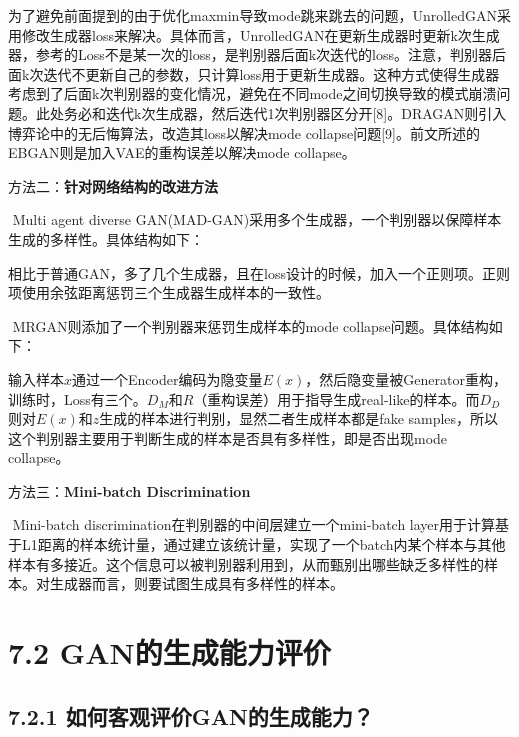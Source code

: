 ​
为了避免前面提到的由于优化maxmin导致mode跳来跳去的问题，UnrolledGAN采用修改生成器loss来解决。具体而言，UnrolledGAN在更新生成器时更新k次生成器，参考的Loss不是某一次的loss，是判别器后面k次迭代的loss。注意，判别器后面k次迭代不更新自己的参数，只计算loss用于更新生成器。这种方式使得生成器考虑到了后面k次判别器的变化情况，避免在不同mode之间切换导致的模式崩溃问题。此处务必和迭代k次生成器，然后迭代1次判别器区分开{[}8{]}。DRAGAN则引入博弈论中的无后悔算法，改造其loss以解决mode
collapse问题{[}9{]}。前文所述的EBGAN则是加入VAE的重构误差以解决mode
collapse。

方法二：\textbf{针对网络结构的改进方法}

​ Multi agent diverse
GAN(MAD-GAN)采用多个生成器，一个判别器以保障样本生成的多样性。具体结构如下：

\caption{}

​
相比于普通GAN，多了几个生成器，且在loss设计的时候，加入一个正则项。正则项使用余弦距离惩罚三个生成器生成样本的一致性。

​ MRGAN则添加了一个判别器来惩罚生成样本的mode
collapse问题。具体结构如下：

\caption{}

​
输入样本\(x​\)通过一个Encoder编码为隐变量\(E(x)​\)，然后隐变量被Generator重构，训练时，Loss有三个。\(D_M​\)和\(R​\)（重构误差）用于指导生成real-like的样本。而\(D_D​\)则对\(E(x)​\)和\(z​\)生成的样本进行判别，显然二者生成样本都是fake
samples，所以这个判别器主要用于判断生成的样本是否具有多样性，即是否出现mode
collapse。

方法三：\textbf{Mini-batch Discrimination}

​ Mini-batch discrimination在判别器的中间层建立一个mini-batch
layer用于计算基于L1距离的样本统计量，通过建立该统计量，实现了一个batch内某个样本与其他样本有多接近。这个信息可以被判别器利用到，从而甄别出哪些缺乏多样性的样本。对生成器而言，则要试图生成具有多样性的样本。

\section{7.2
GAN的生成能力评价}\label{ganux7684ux751fux6210ux80fdux529bux8bc4ux4ef7}

\subsection{7.2.1
如何客观评价GAN的生成能力？}\label{ux5982ux4f55ux5ba2ux89c2ux8bc4ux4ef7ganux7684ux751fux6210ux80fdux529b}

